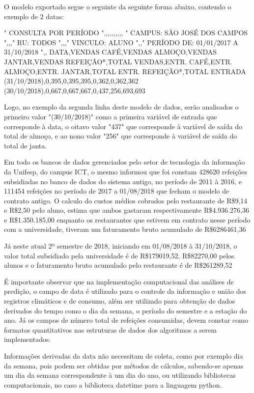 \documentclass[	12pt, Times, openright, twoside, a4paper, english, brazil]{abntex2}
\begin{document}
O modelo exportado segue o seguinte da seguinte forma abaixo, contendo o exemplo de 2 datas: 
\begin{algorithm}[H]
"
CONSULTA POR PERÍODO                    ",,,,,,,,,,
"
CAMPUS: SÃO JOSÉ DOS CAMPOS                    ",,,"
RU: TODOS                    ",,,"
VINCULO: ALUNO                    ",,"
PERÍODO DE: 01/01/2017 A 31/10/2018                        ",,
DATA,VENDAS CAFÉ,VENDAS ALMOÇO,VENDAS JANTAR,VENDAS REFEIÇÃO*,TOTAL VENDAS,ENTR. CAFÉ,ENTR. ALMOÇO,ENTR. JANTAR,TOTAL ENTR. REFEIÇÃO*,TOTAL ENTRADA
(31/10/2018),0,395,0,395,395,0,362,0,362,362
(30/10/2018),0,667,0,667,667,0,437,256,693,693
\end{algorithm}

Logo, no exemplo da segunda linha deste modelo de dados, serão analisados o primeiro valor "(30/10/2018)" como a primeira variável de entrada que corresponde à data, o oitavo valor "437" que corresponde à variável de saída do total de almoço, e ao nono valor "256" que corresponde à variável de saída do total de janta.

Em todo os bancos de dados gerenciados pelo setor de tecnologia da informação da Unifesp, do campus ICT, o mesmo informou que foi constam 428620 refeições subsidiadas no banco de dados do sistema antigo, no período de 2011 à 2016, e 111454 refeições no período de 2017 a 01/08/2018 que fecham o modelo de contrato antigo. O calculo do custos médios cobrados pelo restaurante de R\$9,14 e R\$2,50 pelo aluno, estima que ambos gastaram respectivamente R\$4.936.276,36 e R\$1.350.185,00 enquanto os restaurantes que estivem em contrato nesse período com a universidade, tiveram um faturamento bruto acumulado de R\$6286461,36

Já neste atual 2º semestre de 2018, iniciando em 01/08/2018 à 31/10/2018, o valor total subsidiado pela universidade é de R\$179019,52, R\$82270,00 pelos alunos e o faturamento bruto acumulado pelo restaurante é de R\$261289,52

É importante observar que na implementação computacional das análises de predição, o campo de data é utilizado para o controle da informação e união dos registros climáticos e de consumo, além ser utilizado para obtenção de dados derivados do tempo como o dia da semana, o período do semestre e a estação do ano. Já os campos de número total de refeições consumidas, devem constar como formatos quantitativos nas estruturas de dados dos algoritmos a serem implementados.

Informações derivadas da data não necessitam de coleta, como por exemplo dia da semana, pois podem ser obtidas por métodos de cálculos, sabendo-se apenas um dia da semana correspondente à um dia do ano, ou utilizando bibliotecas computacionais, no caso a biblioteca datetime para a linguagem python.
\end{document}
